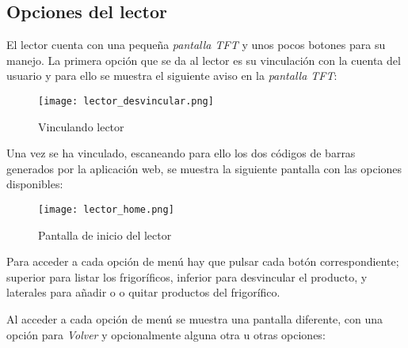 \subsection{Opciones del lector}

El lector cuenta con una pequeña \emph{pantalla TFT} y unos pocos botones para su manejo. La primera opción que se da al lector es su vinculación con la cuenta del usuario y para ello se muestra el siguiente aviso en la \emph{pantalla TFT}:

\begin{figure}[h!]
    \centering
    \texttt{[image: lector\_desvincular.png]}
    \caption{Vinculando lector}\label{fig:lector_desvincular}
\end{figure}

Una vez se ha vinculado, escaneando para ello los dos códigos de barras generados por la aplicación web, se muestra la siguiente pantalla con las opciones disponibles:

\begin{figure}[h!]
    \centering
    \texttt{[image: lector\_home.png]}
    \caption{Pantalla de inicio del lector}\label{fig:lector_home}
\end{figure}

Para acceder a cada opción de menú hay que pulsar cada botón correspondiente; superior para listar los frigoríficos, inferior para desvincular el producto, y laterales para añadir o o quitar productos del frigorífico.

Al acceder a cada opción de menú se muestra una pantalla diferente, con una opción para \emph{Volver} y opcionalmente alguna otra u otras opciones:

